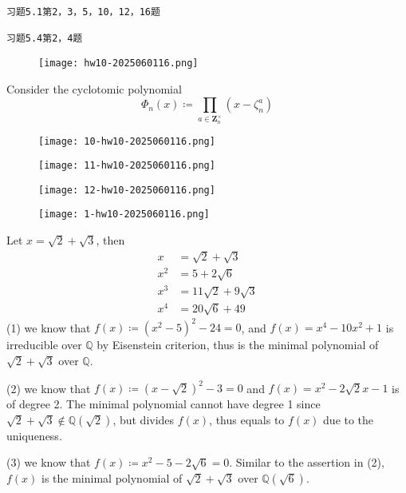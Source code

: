 \begin{lstlisting}
习题5.1第2，3，5，10，12，16题

习题5.4第2，4题
\end{lstlisting}
\begin{exercise}
\begin{figure}[H]
\centering
\texttt{[image: hw10-2025060116.png]}
\label{}
\end{figure}
\end{exercise}
Consider the cyclotomic polynomial
\[
\Phi _n(x)\coloneqq \prod_{a\in \mathbf{Z}^{\times}_n}(x-\zeta^{a}_n)
\]
\begin{figure}[H]
\centering
\texttt{[image: 10-hw10-2025060116.png]}
\label{}
\end{figure}
\begin{figure}[H]
\centering
\texttt{[image: 11-hw10-2025060116.png]}
\label{}
\end{figure}
\begin{figure}[H]
\centering
\texttt{[image: 12-hw10-2025060116.png]}
\label{}
\end{figure}

\begin{exercise}
\begin{figure}[H]
\centering
\texttt{[image: 1-hw10-2025060116.png]}
\label{}
\end{figure}
\end{exercise}
Let $x=\sqrt{ 2 }+\sqrt{ 3 }$, then
\[
\begin{aligned}
x & =\sqrt{ 2 }+\sqrt{ 3 } \\
x^2 & =5+2\sqrt{ 6 } \\
x^3 & =11 \sqrt{2}+9 \sqrt{3} \\
x^{4} & =20 \sqrt{6}+49
\end{aligned}
\]
(1) we know that $f(x)\coloneqq(x^2-5)^2-24=0$, and $f(x)=x^{4}-10x^2+1$ is irreducible over $\mathbb{Q}$ by Eisenstein criterion, thus is the minimal polynomial of $\sqrt{ 2 }+\sqrt{ 3 }$ over $\mathbb{Q}$.

(2) we know that $f(x)\coloneqq(x-\sqrt{ 2 })^2-3=0$ and $f(x)=x^2-2\sqrt{ 2 }x-1$ is of degree 2. The minimal polynomial cannot have degree 1 since $\sqrt{ 2 }+\sqrt{ 3 }\not\in \mathbb{Q}(\sqrt{ 2 })$, but divides $f(x)$, thus equals to $f(x)$ due to the uniqueness.

(3) we know that $f(x)\coloneqq x^2-5-2\sqrt{ 6 }=0$. Similar to the assertion in (2), $f(x)$ is the minimal polynomial of $\sqrt{ 2 }+\sqrt{ 3 }$ over $\mathbb{Q}(\sqrt{ 6 })$.

